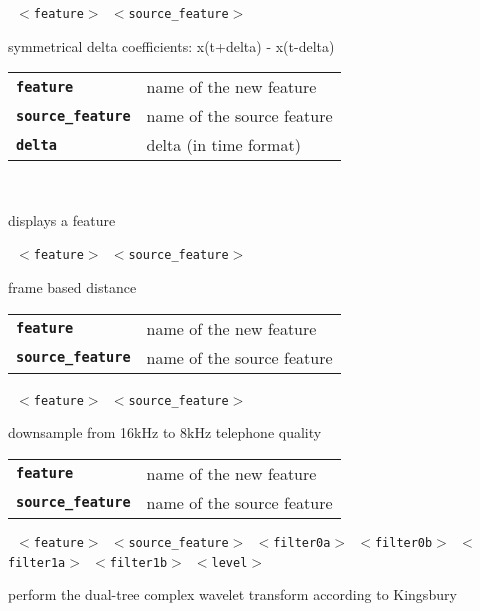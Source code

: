 \begin{description}
\begin{description}
       \texttt{ $<$feature$>$ $<$source\_feature$>$ } \

        symmetrical delta coefficients: x(t+delta) - x(t-delta)

      \begin{tabular}{ll}
 \texttt{\textbf{feature}} &         name of the new feature \\
 \texttt{\textbf{source\_feature}} &  name of the source feature \\
 \texttt{\textbf{delta}} &            delta (in time format)  \\
      \end{tabular}
       \texttt{} \

        displays a feature

       \texttt{ $<$feature$>$ $<$source\_feature$>$} \

        frame based distance

      \begin{tabular}{ll}
 \texttt{\textbf{feature}} &         name of the new feature \\
 \texttt{\textbf{source\_feature}} &  name of the source feature \\
      \end{tabular}
       \texttt{ $<$feature$>$ $<$source\_feature$>$} \

        downsample from 16kHz to 8kHz telephone quality

      \begin{tabular}{ll}
 \texttt{\textbf{feature}} &         name of the new feature \\
 \texttt{\textbf{source\_feature}} &  name of the source feature \\
      \end{tabular}
       \texttt{ $<$feature$>$ $<$source\_feature$>$ $<$filter0a$>$ $<$filter0b$>$ $<$filter1a$>$ $<$filter1b$>$ $<$level$>$ } \

        perform the dual-tree complex wavelet transform according to Kingsbury


\end{description}
\end{description}
